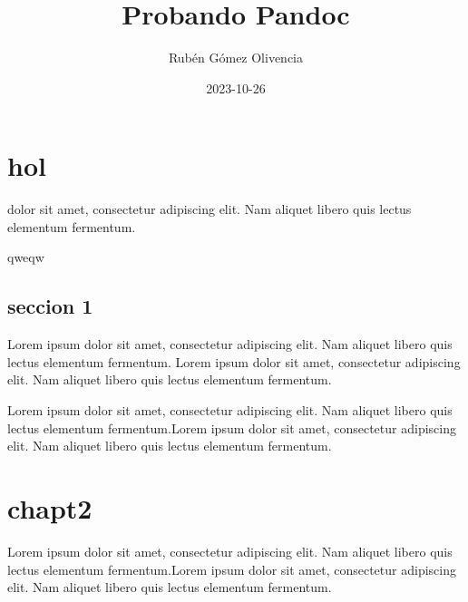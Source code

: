 
\title{Probando Pandoc}
\author{Rubén Gómez Olivencia}
\date{2023-10-26}

\usepackage{tcolorbox}

\newcommand{\custombox}[6]{
    \begin{tcolorbox}[
        colframe=#1, colbacktitle=#1,
        colupper=#1, colback=#3,
        enhanced, sidebyside, segmentation hidden,
        lefthand width=1.2cm,
        title=\textbf{#4},]
      \centering
      \color{#1}
      \fontsize{30pt}{-10pt}#5
      \tcblower
        \color{#2}
      #6
    \end{tcolorbox}
}
\newcommand{\infobox}[1]{
    \custombox{cyan!60!black}{black}{cyan!5!white}{Información}{\faInfoCircle}{#1}
}





\chapter{hol}

 dolor sit amet, consectetur adipiscing elit. Nam aliquet libero quis lectus elementum fermentum.

\infobox{qweqw}

\section{seccion 1}
Lorem ipsum dolor sit amet, consectetur adipiscing elit. Nam aliquet libero quis lectus elementum fermentum.
Lorem ipsum dolor sit amet, consectetur adipiscing elit. Nam aliquet libero quis lectus elementum fermentum.


Lorem ipsum dolor sit amet, consectetur adipiscing elit. Nam aliquet libero quis lectus elementum fermentum.Lorem ipsum dolor sit amet, consectetur adipiscing elit. Nam aliquet libero quis lectus elementum fermentum.


\chapter{chapt2}
Lorem ipsum dolor sit amet, consectetur adipiscing elit. Nam aliquet libero quis lectus elementum fermentum.Lorem ipsum dolor sit amet, consectetur adipiscing elit. Nam aliquet libero quis lectus elementum fermentum.

